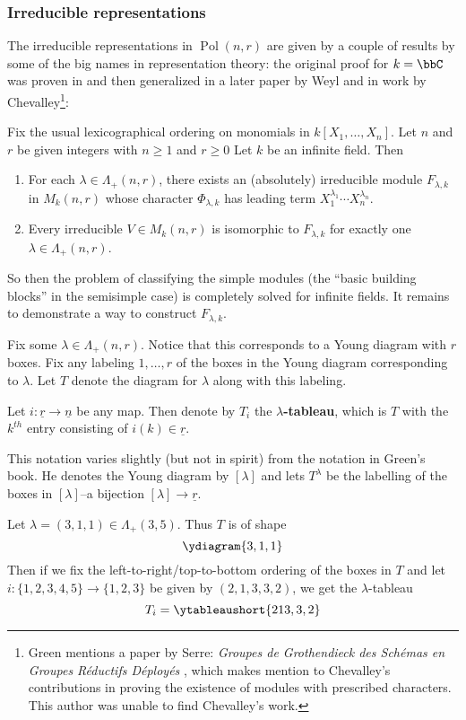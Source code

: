 \documentclass[12pt]{article}
\DeclareMathOperator{\Pol}{Pol}
\begin{document}
\subsubsection{Irreducible representations}
The irreducible representations in $\Pol(n,r)$ are given by a couple of results by some of the big names in representation theory: the original proof for $k=\bbC$ was proven in \cite[p.37]{schur-thesis} and then 
generalized in a later paper by Weyl \cite{weyl} and in work by Chevalley\footnote{Green \cite{green} mentions a paper by Serre: \textit{Groupes de Grothendieck des Sch\'emas en Groupes R\'eductifs D\'eploy\'es} \cite{serre-chevalley}, which 
makes mention to Chevalley's contributions in proving the existence of modules with prescribed characters. This author was unable to find Chevalley's work.}:
\begin{thm}\label{thm:irreps}
	Fix the usual lexicographical ordering on monomials in $k[X_1,\dots,X_n]$. Let $n$ and $r$ be given integers with $n\ge 1$ and $r\ge 0$ Let $k$ be an infinite field. Then 
	\begin{enumerate}
		\item For each $\lambda\in\Lambda_+(n,r)$, there exists an (absolutely) irreducible module $F_{\lambda,k}$
		in $M_k(n,r)$ whose character $\Phi_{\lambda,k}$ has leading term $X_1^{\lambda_1}\cdots X_n^{\lambda_n}$.
		\item Every irreducible $V\in M_k(n,r)$ is isomorphic to $F_{\lambda,k}$ for exactly one $\lambda\in \Lambda_+(n,r)$.
	\end{enumerate}
\end{thm}
So then the problem of classifying the simple modules (the ``basic building blocks'' in the semisimple case) is completely solved for infinite fields.
It remains to demonstrate a way to construct $F_{\lambda,k}$.
\begin{defn}
	Fix some $\lambda\in \Lambda_+(n,r)$. Notice that this corresponds to a Young diagram with $r$ boxes. Fix any labeling $1,\dots,r$ of the boxes in the 
	Young diagram corresponding to $\lambda$. Let $T$ denote the diagram for $\lambda$ along with this labeling.
	
	Let $i:\underline r\to\underline n$ be any map. Then denote by $T_i$ the \textbf{$\lambda$-tableau}, which is $T$ with the $k^{th}$ entry consisting of $i(k)\in\underline r$.
\end{defn}
\begin{rmk}
	This notation varies slightly (but not in spirit) from the notation in Green's book. He denotes the Young diagram by $[\lambda]$ and lets $T^\lambda$ be 
	the labelling of the boxes in $[\lambda]$--a bijection $[\lambda]\to\underline r$.
\end{rmk}
\begin{ex}
	Let $\lambda=(3,1,1)\in\Lambda_+(3,5)$. Thus $T$ is of shape 
	\[\ydiagram{3,1,1}\]
	Then if we fix the left-to-right/top-to-bottom ordering of the boxes in $T$ and let $i:\{1,2,3,4,5\}\to\{1,2,3\}$
	be given by $(2,1,3,3,2)$, we get the $\lambda$-tableau 
	\[T_i=\ytableaushort{2 1 3, 3, 2}\]
\end{ex}
\end{document}
